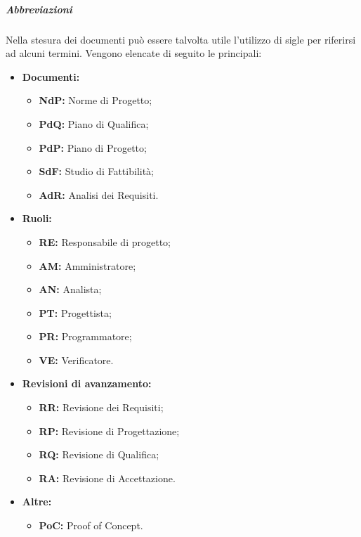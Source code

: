   \subparagraph*{Abbreviazioni}
  Nella stesura dei documenti può essere talvolta utile l'utilizzo di sigle per riferirsi ad alcuni termini. Vengono elencate di seguito le principali:
  \begin{itemize}
  	\item \textbf{Documenti:}
  	\begin{itemize}
  		\item \textbf{NdP:} Norme di Progetto;
  		\item \textbf{PdQ:} Piano di Qualifica;
  		\item \textbf{PdP:} Piano di Progetto;
  		\item \textbf{SdF:} Studio di Fattibilità;
  		\item \textbf{AdR:} Analisi dei Requisiti.
  	\end{itemize}
  	\item \textbf{Ruoli:}
  	\begin{itemize}
  		\item \textbf{RE:} Responsabile di progetto;
  		\item \textbf{AM:} Amministratore;
  		\item \textbf{AN:} Analista;
  		\item \textbf{PT:} Progettista;
  		\item \textbf{PR:} Programmatore;
  		\item \textbf{VE:} Verificatore.
  	\end{itemize}
  	\item \textbf{Revisioni di avanzamento:}
  	\begin{itemize}
  		\item \textbf{RR:} Revisione dei Requisiti;
  		\item \textbf{RP:} Revisione di Progettazione;
  		\item \textbf{RQ:} Revisione di Qualifica;
  		\item \textbf{RA:} Revisione di Accettazione.
  	\end{itemize}
  \item \textbf{Altre:}
	  \begin{itemize}
	  	\item \textbf{PoC:} Proof of Concept.
	  \end{itemize}
  \end{itemize}

